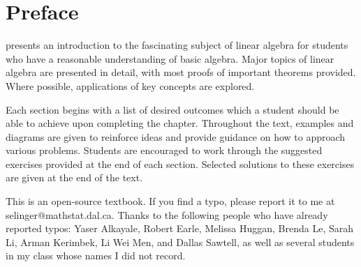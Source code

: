 \chapter*{Preface}

\textit{\bookfulltitle} presents an introduction to the fascinating
subject of linear algebra for students who have a reasonable
understanding of basic algebra. Major topics of linear algebra are
presented in detail, with most proofs of important theorems
provided. Where possible, applications of key concepts are explored.

Each section begins with a list of desired outcomes which a student
should be able to achieve upon completing the chapter.  Throughout the
text, examples and diagrams are given to reinforce ideas and provide
guidance on how to approach various problems. Students are encouraged
to work through the suggested exercises provided at the end of each
section. Selected solutions to these exercises are given at the end of
the text.

This is an open-source textbook. If you find a typo, please report it
to me at selinger@mathstat.dal.ca. Thanks to the following people who
have already reported typos: Yaser Alkayale, Robert Earle, Melissa
Huggan, Brenda Le, Sarah Li, Arman Kerimbek, Li Wei Men, and Dallas
Sawtell, as well as several students in my class whose names I did not
record.
